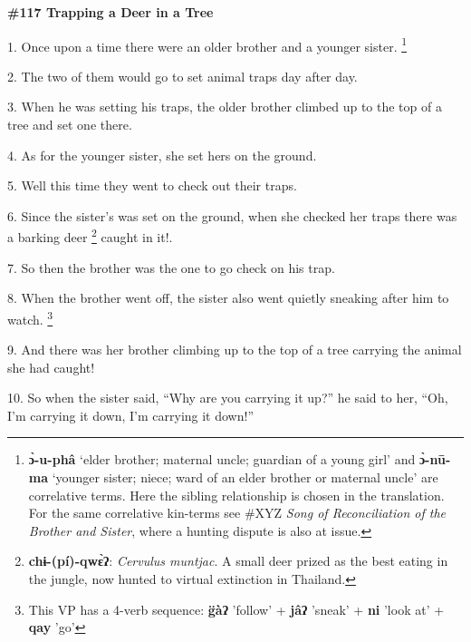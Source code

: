 
\textbf{\#117 Trapping a Deer in a Tree}

1. Once upon a time there were an older brother and a younger sister. \footnote{\textbf{ɔ̀-u-phâ} `elder brother; maternal uncle; guardian of a young girl' and \textbf{ɔ̀-nū-ma }`younger sister; niece; ward of an elder brother or maternal uncle' are correlative terms.  Here the sibling relationship is chosen in the translation. For the same correlative kin-terms see \#XYZ \textit{Song of Reconciliation of the Brother and Sister}, where a hunting dispute is also at issue.}

2. The two of them would go to set animal traps day after day.

3. When he was setting his traps, the older brother climbed up to the top of a
tree and set one there.

4. As for the younger sister, she set hers on the ground.

5. Well this time they went to check out their traps.

6. Since the sister's was set on the ground, when she checked her traps there was
a barking deer \footnote{\textbf{chɨ-(pí)-qwɛ̀ʔ}: \textit{Cervulus muntjac}. A small deer prized as the best eating in the jungle, now hunted to virtual extinction in Thailand.} caught in it!.

7. So then the brother was the one to go check on his trap.

8. When the brother went off, the sister also went quietly sneaking after him to
watch. \footnote{This VP has a 4-verb sequence:  \textbf{g̈àʔ} 'follow' +\textbf{ jâʔ} 'sneak' + \textbf{ni}  'look at' +\textbf{ qay} 'go'}

9. And there was her brother climbing up to the top of a tree carrying the animal
she had caught!

10. So when the sister said, ``Why are you carrying it up?'' he said to her, ``Oh,
I'm carrying it down, I'm carrying it down!''

